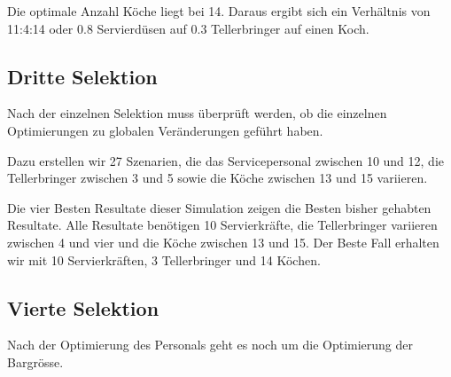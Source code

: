 \documentclass[ngerman,a4paper,12pt]{scrreprt}
\begin{document}
				Die optimale Anzahl Köche liegt bei 14. Daraus ergibt sich ein Verhältnis von 11:4:14 oder 0.8 Servierdüsen auf 0.3 Tellerbringer auf einen Koch.

		
		\subsection{Dritte Selektion}
			Nach der einzelnen Selektion muss überprüft werden, ob die einzelnen Optimierungen zu globalen Veränderungen geführt haben.
			
			Dazu erstellen wir 27 Szenarien, die das Servicepersonal zwischen 10 und 12, die Tellerbringer zwischen 3 und 5 sowie die Köche zwischen 13 und 15 variieren.
			
			Die vier Besten Resultate dieser Simulation zeigen die Besten bisher gehabten Resultate. Alle Resultate benötigen 10 Servierkräfte, die Tellerbringer variieren zwischen 4 und vier und die Köche zwischen 13 und 15. Der Beste Fall erhalten wir mit 10 Servierkräften, 3 Tellerbringer und 14 Köchen.
			
		
		\subsection{Vierte Selektion}
			Nach der Optimierung des Personals geht es noch um die Optimierung der Bargrösse.
			
			
			
			
\end{document}
